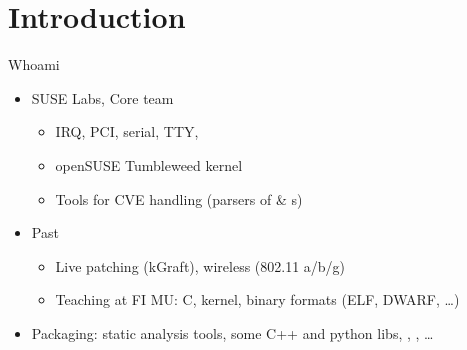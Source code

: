 
\section{Introduction}
\frame{\sectionpage}

\begin{frame}{Whoami}

  \begin{itemize}[<+->]
    \item SUSE Labs, Core team
      \begin{itemize}[<.->]
	\item IRQ, PCI, serial, TTY, \xes
	\item openSUSE Tumbleweed kernel
	\item Tools for CVE handling (parsers of  \& s)
      \end{itemize}
    \item Past
      \begin{itemize}[<.->]
	\item Live patching (kGraft), wireless (802.11 a/b/g)
	\item Teaching at FI MU: C, kernel, binary formats (ELF, DWARF, \dots)
      \end{itemize}
    \item Packaging: static analysis tools, some C++ and python libs, , , \dots
  \end{itemize}

\end{frame}

